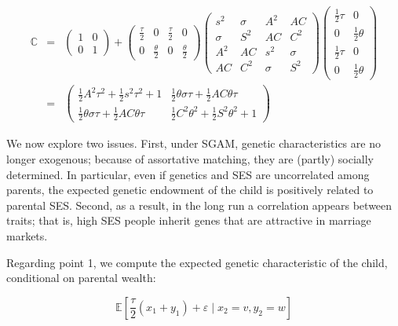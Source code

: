 \documentclass[
  12pt,
]{article}
\theoremstyle{definition}
\theoremstyle{definition}
\theoremstyle{definition}
\theoremstyle{definition}
\theoremstyle{remark}
\begin{document}
\begin{eqnarray}
\mathbb{C} &=&\left( 
\begin{array}{cc}
1 & 0 \\ 
0 & 1%
\end{array}%
\right) +\left( 
\begin{array}{cccc}
\frac{\tau }{2} & 0 & \frac{\tau }{2} & 0 \\ 
0 & \frac{\theta }{2} & 0 & \frac{\theta }{2}%
\end{array}%
\right) \allowbreak \left( 
\begin{array}{cccc}
s^{2} & \sigma  & A^{2} & AC \\ 
\sigma  & S^{2} & AC & C^{2} \\ 
A^{2} & AC & s^{2} & \sigma  \\ 
AC & C^{2} & \sigma  & S^{2}%
\end{array}%
\right) \allowbreak \left( 
\begin{array}{cc}
\frac{1}{2}\tau  & 0 \\ 
0 & \frac{1}{2}\theta  \\ 
\frac{1}{2}\tau  & 0 \\ 
0 & \frac{1}{2}\theta 
\end{array}%
\right) \nonumber \\
&=&\left( 
\begin{array}{cc}
\frac{1}{2}A^{2}\tau ^{2}+\frac{1}{2}s^{2}\tau ^{2}+1 & \frac{1}{2}\theta
\sigma \tau +\frac{1}{2}AC\theta \tau  \\ 
\frac{1}{2}\theta \sigma \tau +\frac{1}{2}AC\theta \tau  & \frac{1}{2}%
C^{2}\theta ^{2}+\frac{1}{2}S^{2}\theta ^{2}+1%
\end{array}%
\right) \allowbreak \label{cov-children-SGAM}
\end{eqnarray}
\newline

We now explore two issues. First, under SGAM, genetic characteristics are no
longer exogenous; because of assortative matching, they are (partly) socially
determined. In particular, even if genetics and SES are uncorrelated among
parents, the expected genetic endowment of the child is positively related to
parental SES. Second, as a result, in the long run a correlation appears between
traits; that is, high SES people inherit genes that are attractive in marriage
markets.

Regarding point 1, we compute the expected genetic characteristic of the
child, conditional on parental wealth:

\begin{equation}
\mathbb{E}\left[ \frac{\tau }{2}\left( x_{1}+y_{1}\right) +\varepsilon \mid
x_{2}=v,y_{2}=w\right]  \label{E-x1-given-x2-y2}
\end{equation}
\end{document}
